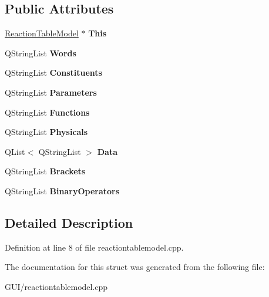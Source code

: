 \subsection*{Public Attributes}
\begin{DoxyCompactItemize}
\item 
\mbox{\label{struct_reaction_table_model_pri_a5bfa4f9c00e2074a88245d547054bc9b}} 
\hyperlink{class_reaction_table_model}{Reaction\+Table\+Model} $\ast$ {\bfseries This}
\item 
\mbox{\label{struct_reaction_table_model_pri_acf5a6a91dc71f195df9c70f1978ef13e}} 
Q\+String\+List {\bfseries Words}
\item 
\mbox{\label{struct_reaction_table_model_pri_a4357a9898be58367ab3235a4eac8872e}} 
Q\+String\+List {\bfseries Constituents}
\item 
\mbox{\label{struct_reaction_table_model_pri_ac0961d5295b2e8938a3f5df4fcd726f9}} 
Q\+String\+List {\bfseries Parameters}
\item 
\mbox{\label{struct_reaction_table_model_pri_a42e5362045c69af78c7be92f43552de5}} 
Q\+String\+List {\bfseries Functions}
\item 
\mbox{\label{struct_reaction_table_model_pri_affa72a01c19d8438df7bf392a7cffcee}} 
Q\+String\+List {\bfseries Physicals}
\item 
\mbox{\label{struct_reaction_table_model_pri_a8b006c4e2e336ef8412112b7ae70e9f9}} 
Q\+List$<$ Q\+String\+List $>$ {\bfseries Data}
\item 
\mbox{\label{struct_reaction_table_model_pri_a24161cb45ef1359c4de9669ebdde6ff7}} 
Q\+String\+List {\bfseries Brackets}
\item 
\mbox{\label{struct_reaction_table_model_pri_a2c862529972d3a01982db669bf894927}} 
Q\+String\+List {\bfseries Binary\+Operators}
\end{DoxyCompactItemize}


\subsection{Detailed Description}


Definition at line 8 of file reactiontablemodel.\+cpp.



The documentation for this struct was generated from the following file\+:\begin{DoxyCompactItemize}
\item 
G\+U\+I/reactiontablemodel.\+cpp\end{DoxyCompactItemize}
